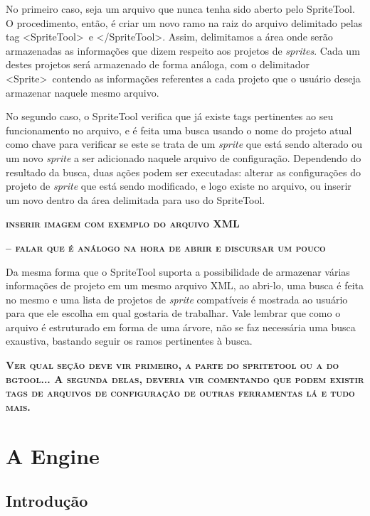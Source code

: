 \documentclass[brazil]{abnt}
\begin{document}
No primeiro caso, seja um arquivo que nunca tenha sido aberto pelo SpriteTool. O procedimento, então, é criar um novo ramo na raiz do arquivo delimitado pelas tag \textless SpriteTool\textgreater~e \textless /SpriteTool\textgreater. Assim, delimitamos a área onde serão armazenadas as informações que dizem respeito aos projetos de \textit{sprites}. Cada um destes projetos será armazenado de forma análoga, com o delimitador \textless Sprite\textgreater~contendo as informações referentes a cada projeto que o usuário deseja armazenar naquele mesmo arquivo. 

No segundo caso, o SpriteTool verifica que já existe tags pertinentes ao seu funcionamento no arquivo, e é feita uma busca usando o nome do projeto atual como chave para verificar se este se trata de um \textit{sprite} que está sendo alterado ou um novo \textit{sprite} a ser adicionado naquele arquivo de configuração. Dependendo do resultado da busca, duas ações podem ser executadas: alterar as configurações do projeto de \textit{sprite} que está sendo modificado, e logo existe no arquivo, ou inserir um novo dentro da área delimitada para uso do SpriteTool.

\textsc{\textbf{inserir imagem com exemplo do arquivo XML}}

\textsc{\textbf{-- falar que é análogo na hora de abrir e discursar um pouco}}

Da mesma forma que o SpriteTool suporta a possibilidade de armazenar várias informações de projeto em um mesmo arquivo XML, ao abri-lo, uma busca é feita no mesmo e uma lista de projetos de \textit{sprite} compatíveis é mostrada ao usuário para que ele escolha em qual gostaria de trabalhar. Vale lembrar que como o arquivo é estruturado em forma de uma árvore, não se faz necessária uma busca exaustiva, bastando seguir os ramos pertinentes à busca. 

\textsc{\textbf{Ver qual seção deve vir primeiro, a parte do spritetool ou a do bgtool... A segunda delas, deveria vir comentando que podem existir tags de arquivos de configuração de outras ferramentas lá e tudo mais.}}


\chapter{A Engine}

\section{Introdução}
\end{document}
